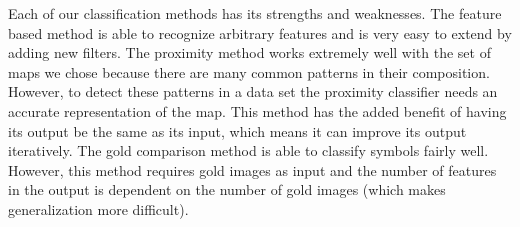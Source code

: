 
Each of our classification methods has its strengths and weaknesses.  The
feature based method is able to recognize arbitrary features and is very easy
to extend by adding new filters.  The proximity method works extremely well
with the set of maps we chose because there are many common patterns in their
composition.  However, to detect these patterns in a data set the proximity
classifier needs an accurate representation of the map. This method has the
added benefit of having its output be the same as its input, which means it can
improve its output iteratively.  The gold comparison method is able to classify
symbols fairly well. However, this method requires gold images as input and the
number of features in the output is dependent on the number of gold images
(which makes generalization more difficult).

